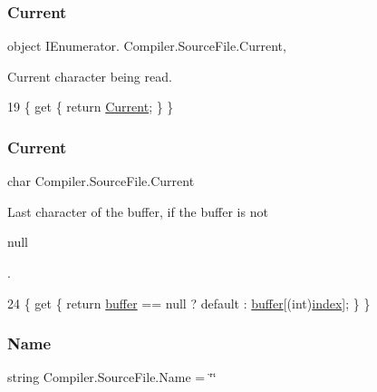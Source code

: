 \subsubsection{\texorpdfstring{Current}{Current}\hspace{0.1cm}{\footnotesize\ttfamily [1/2]}}
{\footnotesize\ttfamily object I\+Enumerator. Compiler.\+Source\+File.\+Current\hspace{0.3cm}{\ttfamily [get]}, {\ttfamily [private]}}

Current character being read. 
\begin{DoxyCode}
19 \{ \textcolor{keyword}{get} \{ \textcolor{keywordflow}{return} \mbox{\hyperlink{class_compiler_1_1_source_file_a4a0d8f66b3c7de70edadb1761aaf65b5}{Current}}; \} \}
\end{DoxyCode}
\mbox{\label{class_compiler_1_1_source_file_a2d009621871245dfb64d3866ece03633}} 
\subsubsection{\texorpdfstring{Current}{Current}\hspace{0.1cm}{\footnotesize\ttfamily [2/2]}}
{\footnotesize\ttfamily char Compiler.\+Source\+File.\+Current\hspace{0.3cm}{\ttfamily [get]}}

Last character of the buffer, if the buffer is not
\begin{DoxyCode}
null 
\end{DoxyCode}
 . 
\begin{DoxyCode}
24 \{ \textcolor{keyword}{get} \{ \textcolor{keywordflow}{return} \mbox{\hyperlink{class_compiler_1_1_source_file_a6ac27509abd78029bf3881636983ab48}{buffer}} == null ? default : \mbox{\hyperlink{class_compiler_1_1_source_file_a6ac27509abd78029bf3881636983ab48}{buffer}}[(int)\mbox{\hyperlink{class_compiler_1_1_source_file_a46a2996b918f0b2f795449879663cfe5}{index}}]; \} \}
\end{DoxyCode}
\mbox{\label{class_compiler_1_1_source_file_a0e304ca0e3d5b0af3dd18d09520f215e}} 
\subsubsection{\texorpdfstring{Name}{Name}}
{\footnotesize\ttfamily string Compiler.\+Source\+File.\+Name = \char`\"{}\char`\"{}\hspace{0.3cm}{\ttfamily [get]}}

